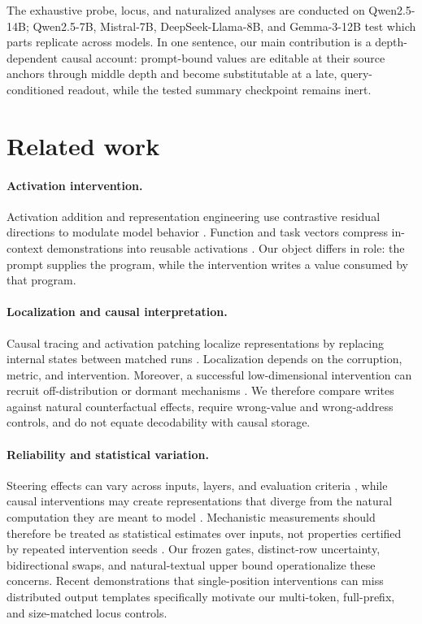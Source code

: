 \documentclass[10pt]{article}
\begin{document}
The exhaustive probe, locus, and naturalized analyses are conducted on
Qwen2.5-14B; Qwen2.5-7B, Mistral-7B, DeepSeek-Llama-8B, and Gemma-3-12B test
which parts replicate across models. In one sentence, our main contribution is
a depth-dependent causal account: prompt-bound values are editable at their
source anchors through middle depth and become substitutable at a late,
query-conditioned readout, while the tested summary checkpoint remains inert.

\section{Related work}

\paragraph{Activation intervention.}
Activation addition and representation engineering use contrastive residual
directions to modulate model behavior \citep{turner2023steering,
zou2023representation,rimsky2024steering}. Function and task vectors compress
in-context demonstrations into reusable activations \citep{hendel2023task,
todd2024function}. Our object differs in role: the prompt supplies the program,
while the intervention writes a value consumed by that program.

\paragraph{Localization and causal interpretation.}
Causal tracing and activation patching localize representations by replacing
internal states between matched runs \citep{meng2022locating,
heimersheim2024patching,zhang2024bestpractices}. Localization depends on the
corruption, metric, and intervention. Moreover, a successful low-dimensional
intervention can recruit off-distribution or dormant mechanisms
\citep{makelov2024illusion}. We therefore compare writes against natural
counterfactual effects, require wrong-value and wrong-address controls, and do
not equate decodability with causal storage.

\paragraph{Reliability and statistical variation.}
Steering effects can vary across inputs, layers, and evaluation criteria
\citep{tan2024generalisation,braun2025unreliability}, while causal
interventions may create representations that diverge from the natural
computation they are meant to model \citep{grant2026divergent}. Mechanistic
measurements should therefore be treated as statistical estimates over inputs,
not properties certified by repeated intervention seeds
\citep{meloux2025variance}. Our frozen gates, distinct-row uncertainty,
bidirectional swaps, and natural-textual upper bound operationalize these
concerns. Recent demonstrations that single-position interventions can miss
distributed output templates \citep{cheng2026single} specifically motivate our
multi-token, full-prefix, and size-matched locus controls.
\end{document}
